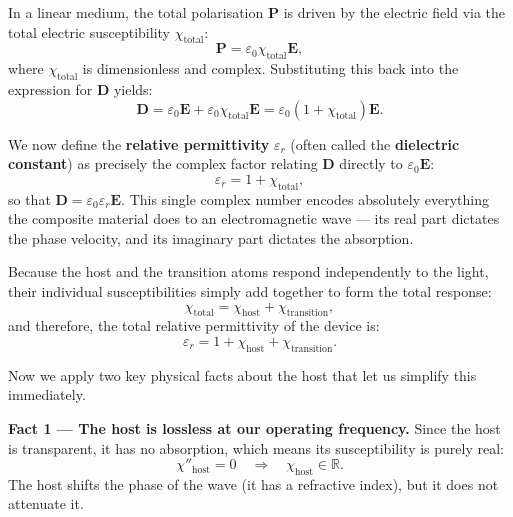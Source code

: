 In a linear medium, the total polarisation $\mathbf{P}$ is driven by the electric field via the total electric susceptibility $\chi_{\text{total}}$:
\begin{equation*}
    \mathbf{P} = \varepsilon_0 \chi_{\text{total}} \mathbf{E},
\end{equation*}
where $\chi_{\text{total}}$ is dimensionless and complex. Substituting this back into the expression for $\mathbf{D}$ yields:
\begin{equation*}
    \mathbf{D} = \varepsilon_0 \mathbf{E} + \varepsilon_0 \chi_{\text{total}} \mathbf{E} = \varepsilon_0(1 + \chi_{\text{total}})\mathbf{E}.
\end{equation*}

We now define the \textbf{relative permittivity} $\varepsilon_r$ (often called the \textbf{dielectric constant}) as precisely the complex factor relating $\mathbf{D}$ directly to $\varepsilon_0 \mathbf{E}$:
\begin{equation*}
    \varepsilon_r = 1 + \chi_{\text{total}},
\end{equation*}
so that $\mathbf{D} = \varepsilon_0 \varepsilon_r \mathbf{E}$. This single complex number encodes absolutely everything the composite material does to an electromagnetic wave — its real part dictates the phase velocity, and its imaginary part dictates the absorption.

Because the host and the transition atoms respond independently to the light, their individual susceptibilities simply add together to form the total response:
\begin{equation*}
    \chi_{\text{total}} = \chi_{\text{host}} + \chi_{\text{transition}},
\end{equation*}
and therefore, the total relative permittivity of the device is:
\begin{equation*}
    \varepsilon_r = 1 + \chi_{\text{host}} + \chi_{\text{transition}}.
\end{equation*}

Now we apply two key physical facts about the host that let us simplify this immediately.

\textbf{Fact 1 — The host is lossless at our operating frequency.} Since the host is transparent, it has no absorption, which means its susceptibility is purely real:
\begin{equation*}
    \chi''_{\text{host}} = 0 \quad \Rightarrow \quad \chi_{\text{host}} \in \mathbb{R}.
\end{equation*}
The host shifts the phase of the wave (it has a refractive index), but it does not attenuate it.

